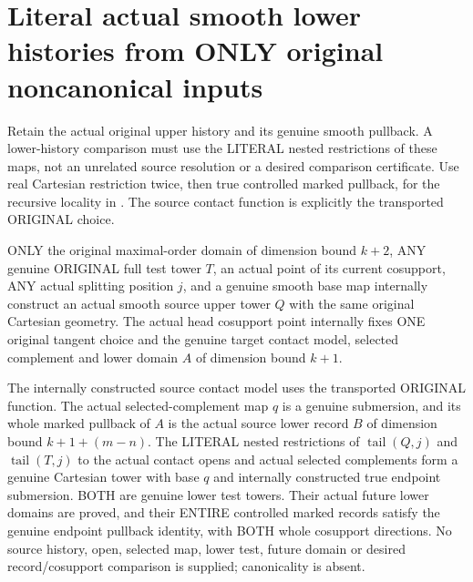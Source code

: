\section{Literal actual smooth lower histories from ONLY original noncanonical inputs}

Retain the actual original upper history and its genuine smooth pullback.
A lower-history comparison must use the LITERAL nested restrictions of these
maps, not an unrelated source resolution or a desired comparison certificate.
Use real Cartesian restriction twice, then true controlled marked pullback,
for the recursive locality in \cite[Section 7]{bierstone-milman08-functoriality}.
The source contact function is explicitly the transported ORIGINAL choice.

\begin{theorem}
\label{hir:original-noncanonical-actual-smooth-lower-history}
\leanok
ONLY the original maximal-order domain of dimension bound $k+2$, ANY genuine
ORIGINAL full test tower $T$, an actual point of its current cosupport, ANY
actual splitting position $j$, and a genuine smooth base map internally
construct an actual smooth source upper tower $Q$ with the same original
Cartesian geometry. The actual head cosupport point internally fixes ONE
original tangent choice and the genuine target contact model, selected
complement and lower domain $A$ of dimension bound $k+1$.

The internally constructed source contact model uses the transported ORIGINAL
function. The actual selected-complement map $q$ is a genuine submersion,
and its whole marked pullback of $A$ is the actual source lower record $B$
of dimension bound $k+1+(m-n)$. The LITERAL nested restrictions of
$\operatorname{tail}(Q,j)$ and $\operatorname{tail}(T,j)$ to the actual
contact opens and actual selected complements form a genuine Cartesian tower
with base $q$ and internally constructed true endpoint submersion. BOTH are
genuine lower test towers. Their actual future lower domains are proved,
and their ENTIRE controlled marked records satisfy the genuine endpoint
pullback identity, with BOTH whole cosupport directions. No source history,
open, selected map, lower test, future domain or desired record/cosupport
comparison is supplied; canonicality is absent.
\end{theorem}
